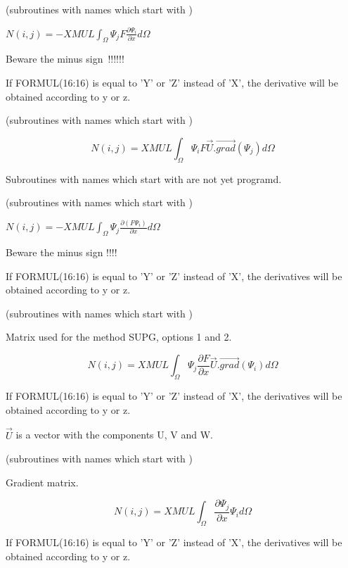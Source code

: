 (subroutines with names which start with )

$N(i,j)=-XMUL \int _{\Omega }
\Psi _{j}  F \frac{\partial \Psi _{i} }{\partial x} d\Omega$

Beware the minus sign~!!!!!!

If FORMUL(16:16) is equal to 'Y' or 'Z' instead of 'X', the derivative will be
obtained according to y or z.


(subroutines with names which start with )

\[N(i,j)=XMUL \int _{\Omega }\Psi _{i}  F\vec{U} . \overrightarrow{grad} (\Psi _{j} )d\Omega  \]

Subroutines with names which start with  are not yet programd.


(subroutines with names which start with )

$N(i,j)=-XMUL \int _{\Omega }\Psi _{j} \frac{\partial (F \Psi _{i} )}{\partial x} d\Omega  $

Beware the minus sign !!!!

If FORMUL(16:16) is equal to 'Y' or 'Z' instead of 'X', the derivatives will be
obtained according to y or z.


(subroutines with names which start with )

Matrix used for the method SUPG, options 1 and 2.

\[N(i,j)=XMUL \int _{\Omega }
\Psi _{j} \frac{\partial F}{\partial x}
\vec{U} . \overrightarrow{grad} (\Psi _{i} )d\Omega \]

If FORMUL(16:16) is equal to 'Y' or 'Z' instead of 'X', the derivatives will be
obtained according to y or z.

$\vec{U}$ is a vector with the components U, V and W.


(subroutines with names which start with )

Gradient matrix.

\[N(i,j)=XMUL \int _{\Omega } \frac{\partial \Psi _{j} }{\partial x} \Psi _{i} d\Omega  \]

If FORMUL(16:16) is equal to 'Y' or 'Z' instead of 'X', the derivatives will be
obtained according to y or z.

